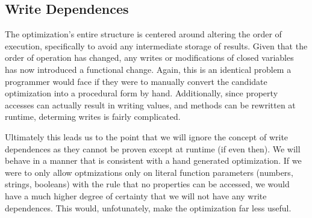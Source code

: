 \subsection{Write Dependences}

The optimization's entire structure is centered around altering the order of execution, specifically to avoid any intermediate storage of results.  Given that the order of operation has changed, any writes or modifications of closed variables has now introduced a functional change.  Again, this is an identical problem a programmer would face if they were to manually convert the candidate optimization into a procedural form by hand.  Additionally, since property accesses can actually result in writing values, and methods can be rewritten at runtime, determing writes is fairly complicated. 

Ultimately this leads us to the point that we will ignore the concept of write dependences as they cannot be proven except at runtime (if even then).  We will behave in a manner that is consistent with a hand generated optimization.  If we were to only allow optmizations only on literal function parameters (numbers, strings, booleans) with the rule that no properties can be accessed, we would have a much higher degree of certainty that we will not have any write dependences. This would, unfotunately, make the optimization far less useful.  